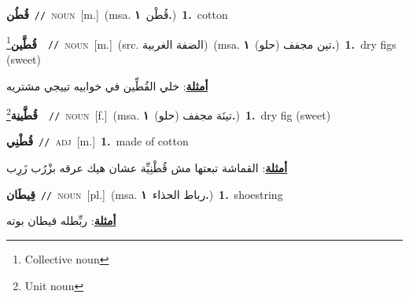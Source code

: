 \documentclass[10pt,a4paper,twoside]{article} %
\begin{document}
\begin{multicols}{2}
{\setlength\topsep{0pt}\textbf{\foreignlanguage{arabic}{قُطُن}}\ {\color{gray}\texttt{//}\color{black}}\ \textsc{noun}\ [m.]\ \color{gray}(msa. \foreignlanguage{arabic}{قُطْن}~\foreignlanguage{arabic}{\textbf{١.}})\color{black}\ \textbf{1.}~cotton\ } \vspace{2mm}

{\setlength\topsep{0pt}\textbf{\foreignlanguage{arabic}{قُطَّين}}\footnote{Collective noun}\ \ {\color{gray}\texttt{//}\color{black}}\ \textsc{noun}\ [m.]\ (src. \color{gray}\foreignlanguage{arabic}{الضفة الغربية}\color{black})\ \color{gray}(msa. \foreignlanguage{arabic}{تين مجفف (حلو)}~\foreignlanguage{arabic}{\textbf{١.}})\color{black}\ \textbf{1.}~dry figs (sweet)\  \begin{flushright}\color{gray}\foreignlanguage{arabic}{\textbf{\underline{\foreignlanguage{arabic}{أمثلة}}}: خلي القُطِّين في خوابيه تييجي مشتريه}\end{flushright}\color{black}} \vspace{2mm}

{\setlength\topsep{0pt}\textbf{\foreignlanguage{arabic}{قُطَّينِة}}\footnote{Unit noun}\ \ {\color{gray}\texttt{//}\color{black}}\ \textsc{noun}\ [f.]\ \color{gray}(msa. \foreignlanguage{arabic}{تينَة مجفف (حلو)}~\foreignlanguage{arabic}{\textbf{١.}})\color{black}\ \textbf{1.}~dry fig (sweet)\ } \vspace{2mm}

{\setlength\topsep{0pt}\textbf{\foreignlanguage{arabic}{قُطْنِي}}\ {\color{gray}\texttt{//}\color{black}}\ \textsc{adj}\ [m.]\ \textbf{1.}~made of cotton\  \begin{flushright}\color{gray}\foreignlanguage{arabic}{\textbf{\underline{\foreignlanguage{arabic}{أمثلة}}}: القماشة تبعتها مش قُطْنِيِّة عشان هيك عرقه بزْرُب زَرِب}\end{flushright}\color{black}} \vspace{2mm}

{\setlength\topsep{0pt}\textbf{\foreignlanguage{arabic}{قِيطَان}}\ {\color{gray}\texttt{//}\color{black}}\ \textsc{noun}\ [pl.]\ \color{gray}(msa. \foreignlanguage{arabic}{رباط الحذاء}~\foreignlanguage{arabic}{\textbf{١.}})\color{black}\ \textbf{1.}~shoestring\  \begin{flushright}\color{gray}\foreignlanguage{arabic}{\textbf{\underline{\foreignlanguage{arabic}{أمثلة}}}: ربِّطله قيطان بوته}\end{flushright}\color{black}} \vspace{2mm}


\end{multicols}
\end{document}
